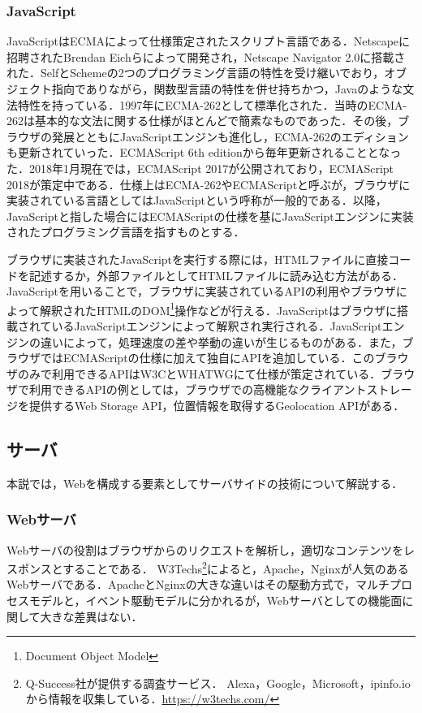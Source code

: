 \subsubsection{JavaScript}
JavaScriptはECMAによって仕様策定されたスクリプト言語である．Netscapeに招聘されたBrendan Eichらによって開発され，Netscape Navigator 2.0に搭載された．SelfとSchemeの2つのプログラミング言語の特性を受け継いでおり，オブジェクト指向でありながら，関数型言語の特性を併せ持ちかつ，Javaのような文法特性を持っている．1997年にECMA-262として標準化された．当時のECMA-262は基本的な文法に関する仕様がほとんどで簡素なものであった．その後，ブラウザの発展とともにJavaScriptエンジンも進化し，ECMA-262のエディションも更新されていった．ECMAScript 6th editionから毎年更新されることとなった．2018年1月現在では，ECMAScript 2017が公開されており，ECMAScript 2018が策定中である．仕様上はECMA-262やECMAScriptと呼ぶが，ブラウザに実装されている言語としてはJavaScriptという呼称が一般的である．以降，JavaScriptと指した場合にはECMAScriptの仕様を基にJavaScriptエンジンに実装されたプログラミング言語を指すものとする．

ブラウザに実装されたJavaScriptを実行する際には，HTMLファイルに直接コードを記述するか，外部ファイルとしてHTMLファイルに読み込む方法がある．JavaScriptを用いることで，ブラウザに実装されているAPIの利用やブラウザによって解釈されたHTMLのDOM\footnote{Document Object Model}操作などが行える．JavaScriptはブラウザに搭載されているJavaScriptエンジンによって解釈され実行される．JavaScriptエンジンの違いによって，処理速度の差や挙動の違いが生じるものがある．また，ブラウザではECMAScriptの仕様に加えて独自にAPIを追加している．このブラウザのみで利用できるAPIはW3CとWHATWGにて仕様が策定されている．ブラウザで利用できるAPIの例としては，ブラウザでの高機能なクライアントストレージを提供するWeb Storage API，位置情報を取得するGeolocation APIがある．
\subsection{サーバ}
本説では，Webを構成する要素としてサーバサイドの技術について解説する．
\subsubsection{Webサーバ}
Webサーバの役割はブラウザからのリクエストを解析し，適切なコンテンツをレスポンスとすることである．
W3Techs\footnote{Q-Success社が提供する調査サービス． Alexa，Google，Microsoft，ipinfo.ioから情報を収集している．\url{https://w3techs.com/}}によると，Apache，Nginxが人気のあるWebサーバである．ApacheとNginxの大きな違いはその駆動方式で，マルチプロセスモデルと，イベント駆動モデルに分かれるが，Webサーバとしての機能面に関して大きな差異はない．
